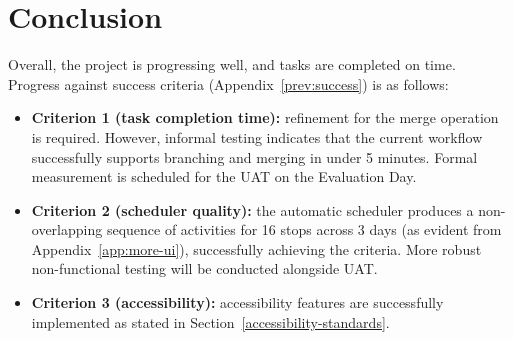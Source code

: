 \section{Conclusion}

Overall, the project is progressing well, and tasks are completed on time. Progress against success criteria (Appendix~\ref{prev:success}) is as follows:
\begin{itemize}
    \item \textbf{Criterion 1 (task completion time):} refinement for the merge operation is required. However, informal testing indicates that the current workflow successfully supports branching and merging in under 5 minutes. Formal measurement is scheduled for the UAT on the Evaluation Day.
    \item \textbf{Criterion 2 (scheduler quality):} the automatic scheduler produces a non-overlapping sequence of activities for 16 stops across 3 days (as evident from Appendix~\ref{app:more-ui}), successfully achieving the criteria. More robust non-functional testing will be conducted alongside UAT.
    \item \textbf{Criterion 3 (accessibility):} accessibility features are successfully implemented as stated in Section~\ref{accessibility-standards}.
\end{itemize}